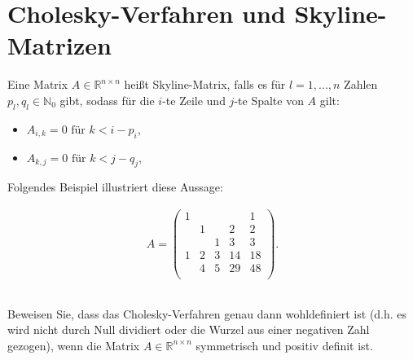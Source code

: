 \documentclass[titlepage]{article}
\begin{document}
\section{Cholesky-Verfahren und Skyline-Matrizen}
Eine Matrix $A \in \mathbb{R}^{n\times n}$ heißt Skyline-Matrix, falls es für $l = 1, ..., n$ Zahlen $p_l, q_l \in \mathbb{N}_0$ gibt, sodass für die $i$-te Zeile und $j$-te Spalte von $A$ gilt:

\begin{itemize}
	\item $A_{i,k} = 0 \text{ für } k < i - p_i$,
	\item $A_{k,j} = 0 \text{ für } k < j - q_j$,
\end{itemize}

Folgendes Beispiel illustriert diese Aussage:

\begin{align*}
	A = \begin{pmatrix}
		1 &   &   &   & 1 \\
		  & 1 &   & 2 & 2 \\
		  &   & 1 & 3 & 3 \\
		1 & 2 & 3 &14 &18 \\
		  & 4 & 5 &29 &48 \\
	\end{pmatrix}.
\end{align*}


\subsection{}
Beweisen Sie, dass das Cholesky-Verfahren genau dann wohldefiniert ist (d.h. es wird nicht durch Null dividiert oder die Wurzel aus einer negativen Zahl gezogen), wenn die Matrix $A \in \mathbb{R}^{n\times n}$ symmetrisch und positiv definit ist.
\end{document}
